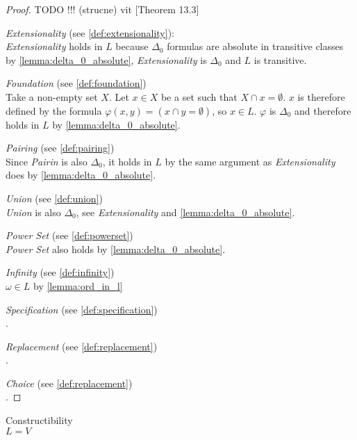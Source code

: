 \begin{proof}
TODO !!! (strucne) vit \cite{JechBook}[Theorem 13.3]
\bce[(i)]
\item \emph{Extensionality} (see \ref{def:extensionality}):\\
\emph{Extensionality} holds in $L$ because $\Delta_0$ formulas are absolute in transitive classes by \ref{lemma:delta_0_absolute}, \emph{Extensionality} is $\Delta_0$ and $L$ is transitive.

\item \emph{Foundation} (see \ref{def:foundation})\\
Take a non-empty set $X$. Let $x \in X$ be a set such that $X \cap x = \emptyset$. $x$ is therefore defined by the formula $\varphi(x, y) = (x \cap y = \emptyset)$, so $x \in L$. $\varphi$ is $\Delta_0$ and therefore holds in $L$ by \ref{lemma:delta_0_absolute}.

\item \emph{Pairing} (see \ref{def:pairing})\\
Since \emph{Pairin} is also $\Delta_0$, it holds in $L$ by the same argument as \emph{Extensionality} does by \ref{lemma:delta_0_absolute}.

\item \emph{Union} (see \ref{def:union})\\
\emph{Union} is also $\Delta_0$, see \emph{Extensionality} and \ref{lemma:delta_0_absolute}.

\item \emph{Power Set} (see \ref{def:powerset})\\
\emph{Power Set} also holds by \ref{lemma:delta_0_absolute}.

\item \emph{Infinity} (see \ref{def:infinity})\\
$\omega \in L$ by \ref{lemma:ord_in_l} %

\item \emph{Specification} (see \ref{def:specification})\\
.

\item \emph{Replacement} (see \ref{def:replacement})\\
.
\item \emph{Choice} (see \ref{def:replacement})\\
.

\ece
\end{proof}

\begin{definition}{Constructibility}\\
$L = V$
\end{definition}

